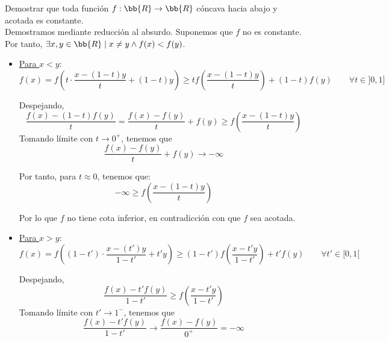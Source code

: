 \begin{ejercicio}
    Demostrar que toda función $f:\bb{R}\to \bb{R}$ cóncava hacia abajo y acotada es constante.\\

    Demostramos mediante reducción al absurdo. Suponemos que $f$ no es constante. Por tanto, $\exists x,y\in \bb{R}\mid x\neq y \land f(x)<f(y)$.
    \begin{itemize}
        \item \underline{Para $x<y$}:
        \begin{equation*}
            f(x) = f\left( t\cdot \frac{x-(1-t)y}{t} + (1-t)y\right) \geq tf\left(\frac{x-(1-t)y}{t}\right) + (1-t)f(y) \qquad \forall t\in ]0,1]
        \end{equation*}

        Despejando,
        \begin{equation*}
            \frac{f(x)-(1-t)f(y)}{t} = \frac{f(x)-f(y)}{t} + f(y) \geq f\left(\frac{x-(1-t)y}{t}\right)
        \end{equation*}
        Tomando límite con $t\to 0^+$, tenemos que
        \begin{equation*}
             \frac{f(x)-f(y)}{t} + f(y) \longrightarrow -\infty
        \end{equation*}
    
        Por tanto, para $t\approx 0$, tenemos que:
        \begin{equation*}
            -\infty \geq f\left(\frac{x-(1-t)y}{t}\right)
        \end{equation*}
    
        Por lo que $f$ no tiene cota inferior, en contradicción con que $f$ sea acotada.

        \item \underline{Para $x>y$}:
        \begin{equation*}
            f(x) = f\left( (1-t')\cdot \frac{x-(t')y}{1-t'} + t'y\right) \geq (1-t')f\left(\frac{x-t'y}{1-t'}\right) + t'f(y) \qquad \forall t'\in [0,1[
        \end{equation*}
        
        Despejando,
        \begin{equation*}
            \frac{f(x)-t'f(y)}{1-t'} \geq f\left(\frac{x-t'y}{1-t'}\right)
        \end{equation*}
        Tomando límite con $t'\to 1^-$, tenemos que
        \begin{equation*}
             \frac{f(x)-t'f(y)}{1-t'} \longrightarrow \frac{f(x)-f(y)}{0^+} = -\infty
        \end{equation*}
    

\end{itemize}
\end{ejercicio}
